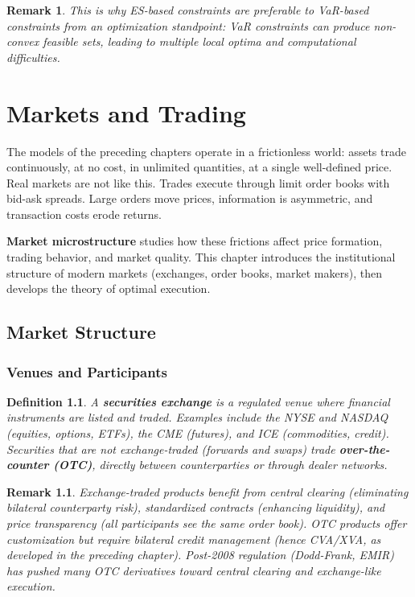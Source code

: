 \documentclass{report}
\theoremstyle{spacedplain}
\theoremstyle{spaceddefinition}
\newtheorem{definition}[theorem]{Definition}
\theoremstyle{spacedremark}
\newtheorem{remark}[theorem]{Remark}
\begin{document}
\begin{remark}
This is why ES-based constraints are preferable to VaR-based constraints from an optimization standpoint: VaR constraints can produce non-convex feasible sets, leading to multiple local optima and computational difficulties.
\end{remark}



\chapter{Markets and Trading}

The models of the preceding chapters operate in a frictionless world: assets trade continuously, at no cost, in unlimited quantities, at a single well-defined price. Real markets are not like this. Trades execute through limit order books with bid-ask spreads. Large orders move prices, information is asymmetric, and transaction costs erode returns.

\textbf{Market microstructure} studies how these frictions affect price formation, trading behavior, and market quality. This chapter introduces the institutional structure of modern markets (exchanges, order books, market makers), then develops the theory of optimal execution.

\section{Market Structure}

\subsection{Venues and Participants}

\begin{definition}
A \textbf{securities exchange} is a regulated venue where financial instruments are listed and traded. Examples include the NYSE and NASDAQ (equities, options, ETFs), the CME (futures), and ICE (commodities, credit). Securities that are not exchange-traded (forwards and  swaps) trade \textbf{over-the-counter (OTC)}, directly between counterparties or through dealer networks.
\end{definition}

\begin{remark}
Exchange-traded products benefit from central clearing (eliminating bilateral counterparty risk), standardized contracts (enhancing liquidity), and price transparency (all participants see the same order book). OTC products offer customization but require bilateral credit management (hence CVA/XVA, as developed in the preceding chapter). Post-2008 regulation (Dodd-Frank, EMIR) has pushed many OTC derivatives toward central clearing and exchange-like execution.
\end{remark}
\end{document}
